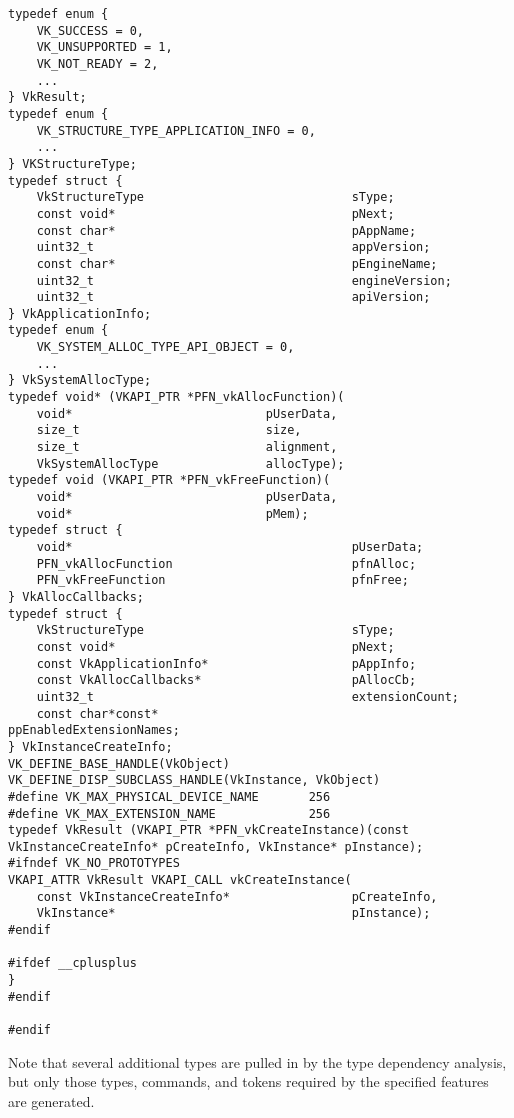 \documentclass{article}
\begin{document}
\begin{verbatim}
typedef enum {
    VK_SUCCESS = 0,
    VK_UNSUPPORTED = 1,
    VK_NOT_READY = 2,
    ...
} VkResult;
typedef enum {
    VK_STRUCTURE_TYPE_APPLICATION_INFO = 0,
    ...
} VKStructureType;
typedef struct {
    VkStructureType                             sType;
    const void*                                 pNext;
    const char*                                 pAppName;
    uint32_t                                    appVersion;
    const char*                                 pEngineName;
    uint32_t                                    engineVersion;
    uint32_t                                    apiVersion;
} VkApplicationInfo;
typedef enum {
    VK_SYSTEM_ALLOC_TYPE_API_OBJECT = 0,
    ...
} VkSystemAllocType;
typedef void* (VKAPI_PTR *PFN_vkAllocFunction)(
    void*                           pUserData,
    size_t                          size,
    size_t                          alignment,
    VkSystemAllocType               allocType);
typedef void (VKAPI_PTR *PFN_vkFreeFunction)(
    void*                           pUserData,
    void*                           pMem);
typedef struct {
    void*                                       pUserData;
    PFN_vkAllocFunction                         pfnAlloc;
    PFN_vkFreeFunction                          pfnFree;
} VkAllocCallbacks;
typedef struct {
    VkStructureType                             sType;
    const void*                                 pNext;
    const VkApplicationInfo*                    pAppInfo;
    const VkAllocCallbacks*                     pAllocCb;
    uint32_t                                    extensionCount;
    const char*const*                           ppEnabledExtensionNames;
} VkInstanceCreateInfo;
VK_DEFINE_BASE_HANDLE(VkObject)
VK_DEFINE_DISP_SUBCLASS_HANDLE(VkInstance, VkObject)
#define VK_MAX_PHYSICAL_DEVICE_NAME       256
#define VK_MAX_EXTENSION_NAME             256
typedef VkResult (VKAPI_PTR *PFN_vkCreateInstance)(const VkInstanceCreateInfo* pCreateInfo, VkInstance* pInstance);
#ifndef VK_NO_PROTOTYPES
VKAPI_ATTR VkResult VKAPI_CALL vkCreateInstance(
    const VkInstanceCreateInfo*                 pCreateInfo,
    VkInstance*                                 pInstance);
#endif

#ifdef __cplusplus
}
#endif

#endif
\end{verbatim}

Note that several additional types are pulled in by the type dependency
analysis, but only those types, commands, and tokens required by the
specified features are generated.
\end{document}
